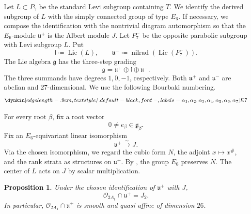 \documentclass[12pt]{article}
\newtheorem{proposition}[theorem]{Proposition}
\theoremstyle{definition}
\begin{document}
Let \(L\subset P_7\) be the standard Levi subgroup containing \(T\). We
identify the derived subgroup of \(L\) with the simply connected group of
type \(E_6\). If necessary, we compose the identification with the
nontrivial diagram automorphism so that the \(E_6\)-module \(\mathfrak u^+\)
is the Albert module \(J\). Let \(P_7^-\) be the opposite parabolic subgroup with
Levi subgroup \(L\). Put
\[
    \mathfrak l\coloneqq\operatorname{Lie}(L),
    \qquad
    \mathfrak u^-
    \coloneqq
    \operatorname{nilrad}(\operatorname{Lie}(P_7^-)).
\]
The Lie algebra \(\mathfrak g\) has the three-step grading
\begin{equation}\label{grading}
    \mathfrak g
    =
    \mathfrak u^+\oplus\mathfrak l\oplus\mathfrak u^-.
\end{equation}
The three summands have degrees \(1,0,-1\), respectively. Both
\(\mathfrak u^+\) and \(\mathfrak u^-\) are abelian and
\(27\)-dimensional. We use the following Bourbaki numbering.
\[
    \dynkin[edge length=.9cm,text style/.default={black,font=\normalsize},labels={\alpha_1,\alpha_2,\alpha_3,\alpha_4,\alpha_5,\alpha_6,\alpha_7}]{E}{7}
\]

For every root \(\beta\), fix a root vector
\[
    0\ne e_\beta\in\mathfrak g_\beta.
\]
Fix an \(E_6\)-equivariant linear isomorphism
\[
    \mathfrak u^+\xrightarrow{\sim}J.
\]
Via the chosen isomorphism, we regard the cubic form \(N\), the adjoint
\(x\mapsto x^\#\), and the rank strata as structures on \(\mathfrak u^+\).
By \cite[Section~1.3]{LM}, the group \(E_6\) preserves \(N\). The center
of \(L\) acts on \(J\) by scalar multiplication.

\begin{proposition}\label{intersection}
Under the chosen identification of \(\mathfrak u^+\) with \(J\),
\[
    \mathcal O_{2A_1}\cap\mathfrak u^+
    =J_2.
\]
In particular, \(\mathcal O_{2A_1}\cap\mathfrak u^+\) is smooth and quasi-affine
of dimension \(26\).
\end{proposition}
\end{document}
